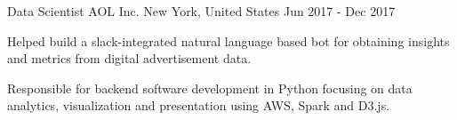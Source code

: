 \begin{cventries}
  \cventry
    {Data Scientist} %
    {AOL Inc.} %
    {New York, United States} %
    {Jun 2017 - Dec 2017} %
    {
      \begin{cvitems} %
        \item {Helped build a slack-integrated natural language based bot for obtaining insights and metrics from digital advertisement data.}
        \item {Responsible for backend software development in Python focusing on data analytics, visualization and presentation using AWS, Spark and D3.js.}
      \end{cvitems}
    }
\end{cventries}
